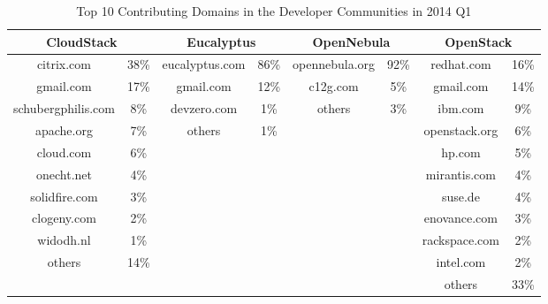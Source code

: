 \documentclass[conference]{IEEEtran}
\begin{document}
\begin{table}[t!]
\caption{Top 10 Contributing Domains in the Developer Communities in 2014 Q1}
\label{tbl:dev}
\centering
\begin{tabular}{|c|c|c|c|c|c|c|c|} \hline
    \multicolumn{2}{|c|}{CloudStack} &
    \multicolumn{2}{|c|}{Eucalyptus} &
    \multicolumn{2}{|c|}{OpenNebula} &
    \multicolumn{2}{|c|}{OpenStack} \\ \hline
citrix.com & 38\% & eucalyptus.com & 86\% & opennebula.org & 92\% & redhat.com & 16\% \\ \hline
    gmail.com & 17\% & gmail.com & 12\% & c12g.com & 5\% & gmail.com & 14\% \\ \hline
	schubergphilis.com & 8\% & devzero.com & 1\% & others & 3\% & ibm.com & 9\% \\ \hline
	apache.org & 7\% & others & 1\% & & & openstack.org & 6\% \\ \hline
	cloud.com & 6\% & & & & & hp.com & 5\% \\ \hline
	onecht.net & 4\% & & & & & mirantis.com & 4\% \\ \hline
	solidfire.com & 3\% & & & & & suse.de & 4\% \\ \hline
	clogeny.com & 2\% & & & & & enovance.com & 3\% \\ \hline
	widodh.nl & 1\% & & & & & rackspace.com & 2\% \\ \hline
	others & 14\% & & & & & intel.com & 2\% \\ \hline
	 &  & & & & & others & 33\% \\ \hline
\end{tabular}
\end{table}
\end{document}
